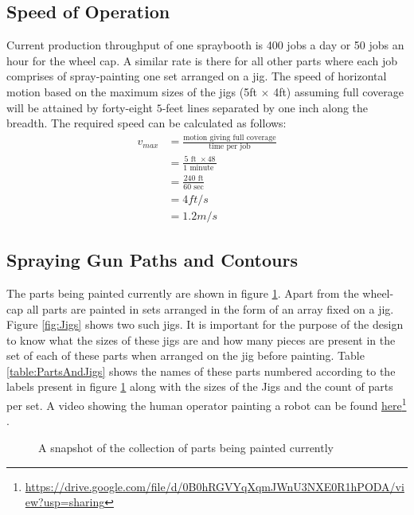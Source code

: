 \documentclass[a4paper,10pt]{article}
\newcommand\fnurl[2]{%
  \href{#1}{#2}\footnote{\url{#1}}%
}
\begin{document}
\subsection{Speed of Operation}
Current production throughput of one spraybooth is 400 jobs a day or 50 jobs an hour for the wheel cap. A similar rate is there
for all other parts where each job comprises of spray-painting one set arranged on a jig. The speed of horizontal motion
based on the maximum sizes of the jigs (5ft $\times$ 4ft) assuming full coverage will be attained by forty-eight $5$-feet lines separated
by one inch along the breadth. The required speed can be calculated as follows:
\begin{align}
 v_{max} &= \frac{\text{motion giving full coverage}}{\text{time per job}} \nonumber \\
 &= \frac{5\text{ ft } \times 48}{1 \text{ minute }} \nonumber \\
 &= \frac{240\text{ ft}}{60 \text{ sec}} \nonumber \\
 &= 4 ft/s \nonumber \\
 &= 1.2 m/s 
\end{align}


\subsection{Spraying Gun Paths and Contours}
 The parts being painted currently are shown in figure \ref{fig:Parts}. Apart from the wheel-cap all parts are painted in sets
 arranged in the form of an array fixed on a jig. Figure \ref{fig:Jigs} shows two such jigs. It is important for the purpose
 of the design to know what the sizes of these jigs are and how many pieces are present in the set of each of these parts
 when arranged on the jig before painting. Table \ref{table:PartsAndJigs} shows the names of these parts numbered according 
 to the labels present in figure \ref{fig:Parts} along with the sizes of the Jigs and the count of parts per set.
 A video showing the human operator painting a robot can be found \fnurl{https://drive.google.com/file/d/0B0hRGVYqXqmJWnU3NXE0R1hPODA/view?usp=sharing}{here}.
\begin{figure}[ht!]
\centering {}
\captionsetup{singlelinecheck=off}
\caption[parts]{A snapshot of the collection of parts being painted currently}
\label{fig:Parts} 
\end{figure}
\end{document}
